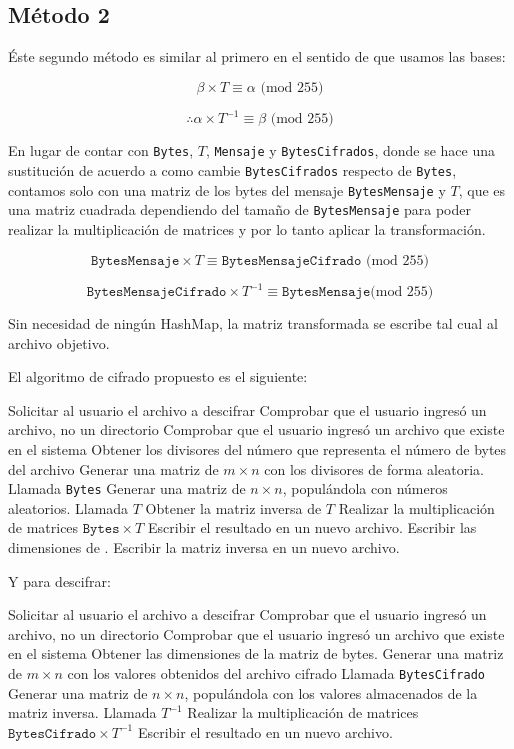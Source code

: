 \documentclass[a4paper]{article}
\begin{document}
\subsection{Método 2}

Éste segundo método es similar al primero en el sentido de que usamos las bases:


\[
\beta \times T \equiv \alpha \text{ (mod 255)}
\]

\[
\therefore \alpha \times T^{-1} \equiv \beta \text{ (mod 255)}
\]

En lugar de contar con \texttt{Bytes}, $T$, \texttt{Mensaje}
y \texttt{BytesCifrados}, donde se hace una sustitución de acuerdo a como
cambie \texttt{BytesCifrados} respecto de \texttt{Bytes}, contamos solo con
una matriz de los bytes del mensaje \texttt{BytesMensaje} y $T$, que es una
matriz cuadrada dependiendo del tamaño de \texttt{BytesMensaje} para poder
realizar la multiplicación de matrices y por lo tanto aplicar la
transformación.

\[
\texttt{BytesMensaje} \times T \equiv \texttt{BytesMensajeCifrado}
\text{ (mod 255)}
\]

\[
\texttt{BytesMensajeCifrado} \times T^{-1} \equiv \texttt{BytesMensaje} \text{
(mod
255)}
\]

Sin necesidad de ningún HashMap, la matriz transformada se escribe tal cual al
archivo objetivo.

El algoritmo de cifrado propuesto es el siguiente:

\begin{outline}[enumerate]
    \1 Solicitar al usuario el archivo a descifrar
    \1 Comprobar que el usuario ingresó un archivo, no un directorio
    \1 Comprobar que el usuario ingresó un archivo que existe en el sistema
    \1 Obtener los divisores del número que representa el número de bytes del
archivo
    \1 Generar una matriz de $m\times n$ con los divisores de forma aleatoria.
Llamada \texttt{Bytes}
    \1 Generar una matriz de $n\times n$, populándola con números aleatorios.
Llamada $T$
    \1 Obtener la matriz inversa de $T$
    \1 Realizar la multiplicación de matrices $\texttt{Bytes} \times T$
    \1 Escribir el resultado en un nuevo archivo.
    \1 Escribir las dimensiones de .
    \1 Escribir la matriz inversa en un nuevo archivo.
\end{outline}

Y para descifrar:

\begin{outline}[enumerate]
    \1 Solicitar al usuario el archivo a descifrar
    \1 Comprobar que el usuario ingresó un archivo, no un directorio
    \1 Comprobar que el usuario ingresó un archivo que existe en el sistema
    \1 Obtener las dimensiones de la matriz de bytes.
    \1 Generar una matriz de $m\times n$ con los valores obtenidos del archivo
cifrado Llamada \texttt{BytesCifrado}
    \1 Generar una matriz de $n\times n$, populándola con los valores
almacenados de la matriz inversa.
Llamada $T^{-1}$
    \1 Realizar la multiplicación de matrices $\texttt{BytesCifrado} \times
T^{-1}$
    \1 Escribir el resultado en un nuevo archivo.
\end{outline}
\end{document}
